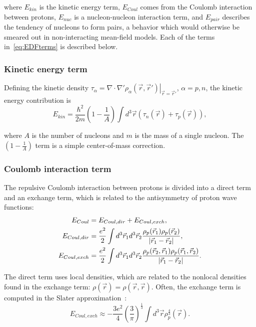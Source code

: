 \noindent where $E_{kin}$ is the kinetic energy term, $E_{Coul}$ comes from the Coulomb interaction between protons, $E_{nuc}$ is a nucleon-nucleon interaction term, and $E_{pair}$ describes the tendency of nucleons to form pairs, a behavior which would otherwise be smeared out in non-interacting mean-field models. Each of the terms in~\eqref{eq:EDFterms} is described below.

\subsubsection{Kinetic energy term}

Defining the kinetic density $\tau_\alpha = \left.\nabla\cdot\nabla'\rho_\alpha(\vec{r},\vec{r}')\right|_{\vec{r}=\vec{r}'}$, $\alpha=p,n$, the kinetic energy contribution is
\begin{equation}
E_{kin} = \frac{\hbar^2}{2m} \left(1-\frac{1}{A}\right) \int d^3\vec{r} \left(\tau_n(\vec{r}) + \tau_p(\vec{r}) \right),
\end{equation}

\noindent where $A$ is the number of nucleons and $m$ is the mass of a single nucleon. The $\left(1-\frac{1}{A}\right)$ term is a simple center-of-mass correction.

\subsubsection{Coulomb interaction term}
The repulsive Coulomb interaction between protons is divided into a direct term and an exchange term, which is related to the antisymmetry of proton wave functions:
\begin{align}
E_{Coul} &= E_{Coul, dir} + E_{Coul, exch}, \\
E_{Coul, dir}& = \frac{e^2}{2} \int d^3\vec{r}_1 d^3\vec{r}_2 \frac{\rho_p(\vec{r}_1)\rho_p(\vec{r}_2)}{\abs{\vec{r}_1-\vec{r}_2}}, \\
E_{Coul, exch} &= \frac{e^2}{2} \int d^3\vec{r}_1 d^3\vec{r}_2 \frac{\rho_p(\vec{r}_2,\vec{r}_1)\rho_p(\vec{r}_1,\vec{r}_2)}{\abs{\vec{r}_1-\vec{r}_2}}.
\end{align}

\noindent The direct term uses local densities, which are related to the nonlocal densities found in the exchange term: $\rho(\vec{r}) = \rho(\vec{r},\vec{r})$. Often, the exchange term is computed in the Slater approximation~\cite{Slater1951, TitinSchnaider1974}:
\begin{equation}
E_{Coul, exch} \approx -\frac{3e^2}{4} \left(\frac{3}{\pi}\right)^\frac{1}{3} \int d^3\vec{r} \rho_p^\frac{4}{3}(\vec{r}).
\end{equation}

